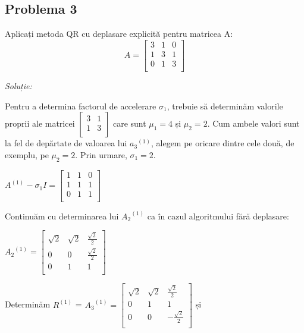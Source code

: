 \documentclass{exam}
\begin{document}

\subsection{Problema  3}
Aplicați metoda QR cu deplasare explicită pentru matricea A:
$$A = \begin{bmatrix}
		3 & 1 & 0 \\
		1 & 3 & 1 \\
		0 & 1 & 3 \\
	\end{bmatrix}$$

\textit{Soluție:}

Pentru a determina factorul de accelerare $\sigma_{1}$, trebuie să determinăm valorile proprii ale matricei
$\begin{bmatrix}
		3 & 1 \\
		1 & 3 \\
	\end{bmatrix}$
care sunt $\mu_{1}=4$ și $\mu_{2}=2$. Cum ambele valori sunt la fel de depărtate de valoarea lui ${a_{3}}^{(1)}$, alegem  pe oricare dintre cele două, de exemplu, pe $\mu_{2}=2$. Prin urmare, $\sigma_{1}=2$.

$A^{(1)} - \sigma_{1} I=\begin{bmatrix}
		1 & 1 & 0 \\
		1 & 1 & 1 \\
		0 & 1 & 1 \\
	\end{bmatrix}$

Continuăm cu determinarea lui ${A_{2}}^{(1)}$ ca în cazul algoritmului fără deplasare:

${A_{2}}^{(1)}=\begin{bmatrix}
		\sqrt{2} & \sqrt{2} & \frac{\sqrt{2}}{2} \\
		0        & 0        & \frac{\sqrt{2}}{2} \\
		0        & 1        & 1                  \\
	\end{bmatrix}$

Determinăm $R^{(1)}$ = ${A_{3}}^{(1)}=\begin{bmatrix}
		\sqrt{2} & \sqrt{2} & \frac{\sqrt{2}}{2}  \\
		0        & 1        & 1                   \\
		0        & 0        & -\frac{\sqrt{2}}{2} \\
	\end{bmatrix}$
și
\end{document}
